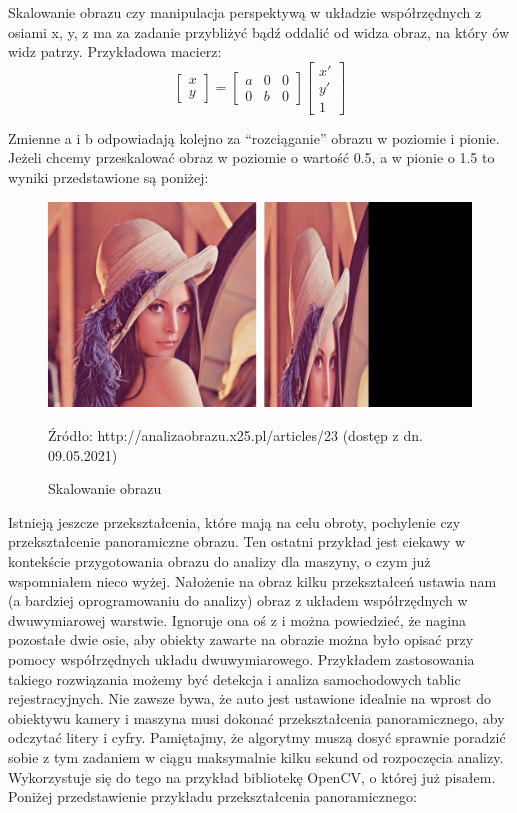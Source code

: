 \documentclass{article}
\begin{document}
	\par
	Skalowanie obrazu czy manipulacja perspektywą w układzie współrzędnych z osiami x, y, z ma za zadanie przybliżyć bądź oddalić od widza obraz, na który ów widz patrzy. Przykładowa macierz:
	\[
	\begin{bmatrix}
		x\\
		y
	\end{bmatrix}
	=
	\begin{bmatrix}
		a & 0 & 0\\
		0 & b & 0
	\end{bmatrix}
	\begin{bmatrix}
		x'\\
		y'\\
		1
	\end{bmatrix}
	\]
	\par
	Zmienne a i b odpowiadają kolejno za “rozciąganie” obrazu w poziomie i pionie. Jeżeli chcemy przeskalować obraz w poziomie o wartość 0.5, a w pionie o 1.5 to wyniki przedstawione są poniżej:
	\begin{figure}
		\centering
		\includegraphics[width=15cm]{scale}
		\caption{Skalowanie obrazu}
		Źródło: http://analizaobrazu.x25.pl/articles/23 (dostęp z dn. 09.05.2021)
	\end{figure}
	\par
	Istnieją jeszcze przekształcenia, które mają na celu obroty, pochylenie czy przekształcenie panoramiczne obrazu. Ten ostatni przykład jest ciekawy w kontekście przygotowania obrazu do analizy dla maszyny, o czym już wspomniałem nieco wyżej. Nałożenie na obraz kilku przekształceń ustawia nam (a bardziej oprogramowaniu do analizy) obraz z układem współrzędnych w dwuwymiarowej warstwie. Ignoruje ona oś z i można powiedzieć, że nagina pozostałe dwie osie, aby obiekty zawarte na obrazie można było opisać przy pomocy współrzędnych układu dwuwymiarowego. Przykładem zastosowania takiego rozwiązania możemy być detekcja i analiza samochodowych tablic rejestracyjnych. Nie zawsze bywa, że auto jest ustawione idealnie na wprost do obiektywu kamery i maszyna musi dokonać przekształcenia panoramicznego, aby odczytać litery i cyfry. Pamiętajmy, że algorytmy muszą dosyć sprawnie poradzić sobie z tym zadaniem w ciągu maksymalnie kilku sekund od rozpoczęcia analizy. Wykorzystuje się do tego na przykład bibliotekę OpenCV, o której już pisałem. Poniżej przedstawienie przykładu przekształcenia panoramicznego:
\end{document}
